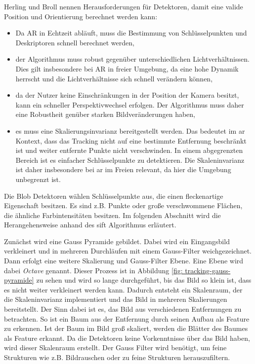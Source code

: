 Herling und Broll\cite{herling2011} nennen Herausforderungen für Detektoren, damit eine valide Position und Orientierung berechnet werden kann:
\begin{itemize}
    \item Da AR in Echtzeit abläuft, muss die Bestimmung von Schlüsselpunkten und Deskriptoren schnell berechnet werden,
    \item der Algorithmus muss robust gegenüber unterschiedlichen Lichtverhältnissen. Dies gilt insbesondere bei AR in freier Umgebung, da eine hohe Dynamik herrscht und die Lichtverhältnisse sich schnell verändern können,
    \item da der Nutzer keine Einschränkungen in der Position der Kamera besitzt, kann ein schneller Perspektivwechsel erfolgen. Der Algorithmus muss daher eine Robustheit genüber starken Bildveränderungen haben,
    \item es muss eine Skalierungsinvarianz bereitgestellt werden. Das bedeutet im \acrshort{ar} Kontext, dass das Tracking nicht auf eine bestimmte Entfernung beschränkt ist und weiter entfernte Punkte nicht verschwinden. In einem abgegrenzten Bereich ist es einfacher Schlüsselpunkte zu detektieren. Die Skaleninvarianz ist daher insbesondere bei \acrshort{ar} im Freien relevant, da hier die Umgebung unbegrenzt ist.
\end{itemize}

Die Blob Detektoren wählen Schlüsselpunkte aus, die einen fleckenartige Eigenschaft besitzen. Es sind z.B. Punkte oder große verschwommene Flächen, die ähnliche Farbintensitäten besitzen\cite[Herling und Broll(2011),][]{herling2011}. Im folgenden Abschnitt wird die Herangehensweise anhand des \acrshort{sift} Algorithmus erläutert.

Zunächst wird eine Gauss Pyramide gebildet. Dabei wird ein Eingangsbild verkleinert und in mehreren Durchläufen mit einem Gauss-Filter weichgezeichnet. Dann erfolgt eine weitere Skalierung und Gauss-Filter Ebene. Eine Ebene wird dabei \textit{Octave} genannt. Dieser Prozess ist in Abbildung \ref*{fig: tracking-gauss-pyramide} zu sehen und wird so lange durchgeführt, bis das Bild so klein ist, dass es nicht weiter verkleinert werden kann. Dadurch entsteht ein Skalenraum, der die Skaleninvarianz implementiert und das Bild in mehreren Skalierungen bereitstellt. Der Sinn dabei ist es, das Bild aus verschiedenen Entfernungen zu betrachten. So ist ein Baum aus der Entfernung durch seinen Aufbau als Feature zu erkennen. Ist der Baum im Bild groß skaliert, werden die Blätter des Baumes als Feature erkannt. Da die Detektoren keine Vorkenntnisse über das Bild haben, wird dieser Skalenraum erstellt. Der Gauss Filter wird benötigt, um feine Strukturen wie z.B. Bildrauschen oder zu feine Strukturen herauszufiltern. 

